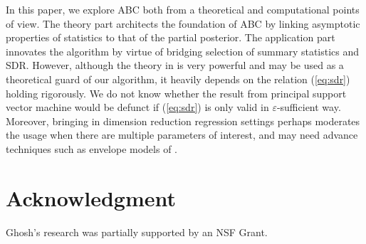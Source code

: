 \begin{comment}
not know epsilon sufficient, not know sufficient lead to intrinsic
consistency,regression had to generate to multivariate theta,dim must
be same
\end{comment}
In this paper, we explore ABC both from a theoretical and computational
points of view. The theory part architects the foundation of ABC by
linking asymptotic properties of statistics to that of the partial
posterior. The application part innovates the algorithm by virtue
of bridging selection of summary statistics and SDR. However, although
the theory in \citet{li1992principal} is very powerful and may be
used as a theoretical guard of our algorithm, it heavily depends on
the relation (\ref{eq:sdr}) holding rigorously. We do not know whether
the result from principal support vector machine would be defunct
if (\ref{eq:sdr}) is only valid in $\varepsilon$-sufficient way.
Moreover, bringing in dimension reduction regression settings perhaps
moderates the usage when there are multiple parameters of interest,
and may need advance techniques such as envelope models of \citet{su2011partial,su2012inner}. 


\section*{Acknowledgment}

Ghosh's research was partially supported by an NSF Grant.
